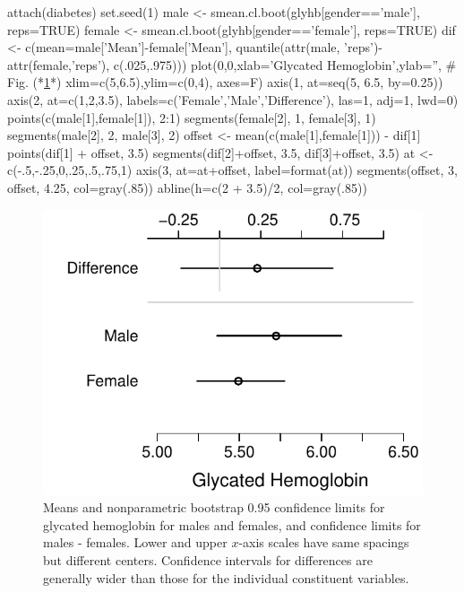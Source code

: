 \begin{Schunk}
\begin{Sinput}
attach(diabetes)
set.seed(1)
male   <- smean.cl.boot(glyhb[gender=='male'],   reps=TRUE)
female <- smean.cl.boot(glyhb[gender=='female'], reps=TRUE)
dif <- c(mean=male['Mean']-female['Mean'],
         quantile(attr(male, 'reps')-attr(female,'reps'), c(.025,.975)))
plot(0,0,xlab='Glycated Hemoglobin',ylab='',   # Fig. (*\ref{fig:descript-cldif}*)
     xlim=c(5,6.5),ylim=c(0,4), axes=F)
axis(1, at=seq(5, 6.5, by=0.25))
axis(2, at=c(1,2,3.5), labels=c('Female','Male','Difference'),
     las=1, adj=1, lwd=0)
points(c(male[1],female[1]), 2:1)
segments(female[2], 1, female[3], 1)
segments(male[2], 2,   male[3], 2)
offset <- mean(c(male[1],female[1])) - dif[1]
points(dif[1] + offset, 3.5)
segments(dif[2]+offset, 3.5, dif[3]+offset, 3.5)
at <- c(-.5,-.25,0,.25,.5,.75,1)
axis(3, at=at+offset, label=format(at))
segments(offset, 3, offset, 4.25, col=gray(.85))
abline(h=c(2 + 3.5)/2, col=gray(.85))
\end{Sinput}
\begin{figure}[htbp]

\centerline{\includegraphics[width=\maxwidth]{descript-cldif-1} }

\caption[Showing group means and differences]{Means and nonparametric bootstrap 0.95 confidence limits for glycated hemoglobin for males and females, and confidence limits for males - females.  Lower and upper $x$-axis scales have same spacings but different centers.  Confidence intervals for differences are generally wider than those for the individual constituent variables.}\label{fig:descript-cldif}
\end{figure}
\end{Schunk}
  
